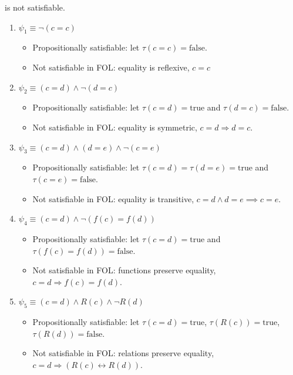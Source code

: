 \documentclass{article}
\begin{document}
is not satisfiable.
\begin{enumerate}
    \item $\psi_1 \equiv \neg(c=c)$

    \begin{itemize}
        \item Propositionally satisfiable: let $\tau(c=c)=\mathrm{false}$.
        \item Not satisfiable in FOL: equality is reflexive, $c=c$
    \end{itemize}

    \item $\psi_2 \equiv (c=d)\wedge \neg(d=c)$

    \begin{itemize}
        \item Propositionally satisfiable: let $\tau(c=d)=\mathrm{true}$ and $\tau(d=c)=\mathrm{false}$.
        \item Not satisfiable in FOL: equality is symmetric, $c=d \Rightarrow d=c$.
    \end{itemize}

    \item $\psi_3 \equiv (c=d)\wedge (d=e)\wedge \neg(c=e)$

    \begin{itemize}
        \item Propositionally satisfiable: let $\tau(c=d)=\tau(d=e)=\mathrm{true}$ and $\tau(c=e)=\mathrm{false}$.
        \item Not satisfiable in FOL: equality is transitive, $c=d \land d=e \implies c=e$.
    \end{itemize}

    \item $\psi_4 \equiv (c=d)\wedge \neg(f(c)=f(d))$

    \begin{itemize}
        \item Propositionally satisfiable: let $\tau(c=d)=\mathrm{true}$ and $\tau(f(c)=f(d))=\mathrm{false}$.
        \item Not satisfiable in FOL: functions preserve equality, $c=d \Rightarrow f(c)=f(d)$.
    \end{itemize}

    \item $\psi_5 \equiv (c=d)\wedge R(c)\wedge \neg R(d)$

    \begin{itemize}
        \item Propositionally satisfiable: let $\tau(c=d)=\mathrm{true}$, $\tau(R(c))=\mathrm{true}$, $\tau(R(d))=\mathrm{false}$.
        \item Not satisfiable in FOL: relations preserve equality, $c=d \Rightarrow (R(c)\leftrightarrow R(d))$.
    \end{itemize}
\end{enumerate}
\bigskip
\end{document}
